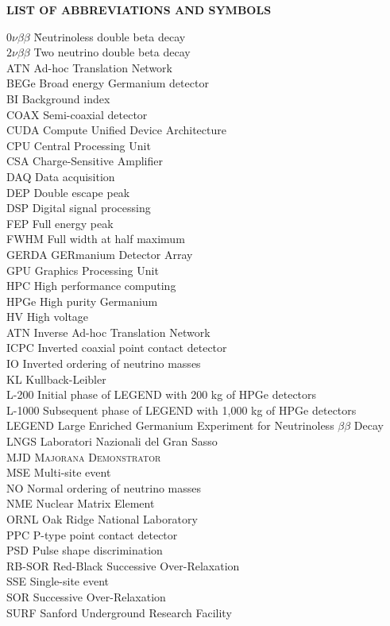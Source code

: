 {}

\begin{center}
{\normalfont \textbf{LIST OF ABBREVIATIONS AND SYMBOLS}}
\end{center}

\newcommand{\Ab}[2]{\noindent  #1 \> #2 \\}
\newcommand{\Abi}[2]{\noindent #1 \hspace{1.5cm} \= #2 \\}

\begin{tabbing}
\Abi{$0\nu\beta\beta$}{Neutrinoless double beta decay}
\Ab{$2\nu\beta\beta$}{Two neutrino double beta decay}
\Ab{ATN}{Ad-hoc Translation Network}
\Ab{BEGe}{Broad energy Germanium detector}
\Ab{BI}{Background index}
\Ab{COAX}{Semi-coaxial detector}
\Ab{CUDA} {Compute Unified Device Architecture}
\Ab{CPU}{Central Processing Unit}
\Ab{CSA} {Charge-Sensitive Amplifier}
\Ab{DAQ}{Data acquisition}
\Ab{DEP}{Double escape peak}
\Ab{DSP}{Digital signal processing}
\Ab{FEP}{Full energy peak}
\Ab{FWHM}{Full width at half maximum}
\Ab{GERDA}{GERmanium Detector Array}
\Ab{GPU}{Graphics Processing Unit}
\Ab{HPC}{High performance computing}
\Ab{HPGe}{High purity Germanium}
\Ab{HV}{High voltage}
\Ab{ATN}{Inverse Ad-hoc Translation Network}
\Ab{ICPC}{Inverted coaxial point contact detector}
\Ab{IO}{Inverted ordering of neutrino masses}
\Ab{KL}{Kullback-Leibler} 
\Ab{L-200}{Initial phase of LEGEND with 200 kg of HPGe detectors}
\Ab{L-1000}{Subsequent phase of LEGEND with 1,000 kg of HPGe detectors}
\Ab{LEGEND}{Large Enriched Germanium Experiment for Neutrinoless $\beta\beta$ Decay}
\Ab{LNGS}{Laboratori Nazionali del Gran Sasso}
\Ab{MJD}{\textsc{Majorana Demonstrator}}
\Ab{MSE}{Multi-site event}
\Ab{NO}{Normal ordering of neutrino masses}
\Ab{NME}{Nuclear Matrix Element}
\Ab{ORNL}{Oak Ridge National Laboratory}
\Ab{PPC}{P-type point contact detector}
\Ab{PSD}{Pulse shape discrimination}
\Ab{RB-SOR} {Red-Black Successive Over-Relaxation}
\Ab{SSE}{Single-site event}
\Ab{SOR} {Successive Over-Relaxation}
\Ab{SURF}{Sanford Underground Research Facility}
\end{tabbing}

\clearpage
